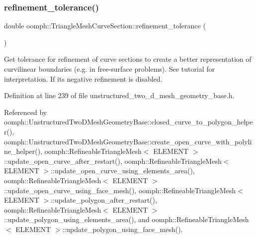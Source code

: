 \mbox{\label{classoomph_1_1TriangleMeshCurveSection_a77470b1ea748cef82a3ffebfd568fe7d}} 
\subsubsection{\texorpdfstring{refinement\+\_\+tolerance()}{refinement\_tolerance()}}
{\footnotesize\ttfamily double oomph\+::\+Triangle\+Mesh\+Curve\+Section\+::refinement\+\_\+tolerance (\begin{DoxyParamCaption}{ }\end{DoxyParamCaption})\hspace{0.3cm}{\ttfamily [inline]}}



Get tolerance for refinement of curve sections to create a better representation of curvilinear boundaries (e.\+g. in free-\/surface problems). See tutorial for interpretation. If it\textquotesingle{}s negative refinement is disabled. 



Definition at line 239 of file unstructured\+\_\+two\+\_\+d\+\_\+mesh\+\_\+geometry\+\_\+base.\+h.



Referenced by oomph\+::\+Unstructured\+Two\+D\+Mesh\+Geometry\+Base\+::closed\+\_\+curve\+\_\+to\+\_\+polygon\+\_\+helper(), oomph\+::\+Unstructured\+Two\+D\+Mesh\+Geometry\+Base\+::create\+\_\+open\+\_\+curve\+\_\+with\+\_\+polyline\+\_\+helper(), oomph\+::\+Refineable\+Triangle\+Mesh$<$ E\+L\+E\+M\+E\+N\+T $>$\+::update\+\_\+open\+\_\+curve\+\_\+after\+\_\+restart(), oomph\+::\+Refineable\+Triangle\+Mesh$<$ E\+L\+E\+M\+E\+N\+T $>$\+::update\+\_\+open\+\_\+curve\+\_\+using\+\_\+elements\+\_\+area(), oomph\+::\+Refineable\+Triangle\+Mesh$<$ E\+L\+E\+M\+E\+N\+T $>$\+::update\+\_\+open\+\_\+curve\+\_\+using\+\_\+face\+\_\+mesh(), oomph\+::\+Refineable\+Triangle\+Mesh$<$ E\+L\+E\+M\+E\+N\+T $>$\+::update\+\_\+polygon\+\_\+after\+\_\+restart(), oomph\+::\+Refineable\+Triangle\+Mesh$<$ E\+L\+E\+M\+E\+N\+T $>$\+::update\+\_\+polygon\+\_\+using\+\_\+elements\+\_\+area(), and oomph\+::\+Refineable\+Triangle\+Mesh$<$ E\+L\+E\+M\+E\+N\+T $>$\+::update\+\_\+polygon\+\_\+using\+\_\+face\+\_\+mesh().

